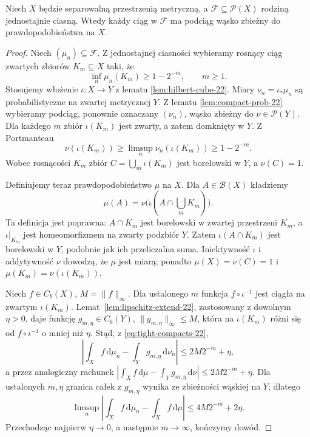 \begin{twierdzenie}
\label{thm:prokhorov-forward-22}
Niech $X$ będzie separowalną przestrzenią metryczną,
a $\mathcal F\subseteq\mathcal P(X)$ rodziną jednostajnie
ciasną. Wtedy każdy ciąg w $\mathcal F$ ma podciąg
wąsko zbieżny do prawdopodobieństwa na $X$.
\end{twierdzenie}
\begin{proof}
Niech $(\mu_n)\subseteq\mathcal F$.
Z jednostajnej ciasności wybieramy rosnący ciąg
zwartych zbiorów $K_m\subseteq X$ taki, że
\begin{equation}\label{eq:tight-compacts-22}
 \inf_n\mu_n(K_m)\ge1-2^{-m},\qquad m\ge1.
\end{equation}
Stosujemy włożenie $\iota:X\to Y$ z lematu
\ref{lem:hilbert-cube-22}. Miary
$\nu_n=\iota_*\mu_n$ są probabilistyczne na
zwartej metrycznej $Y$. Z lematu
\ref{lem:compact-prob-22} wybieramy podciąg,
ponownie oznaczany $(\nu_n)$, wąsko zbieżny
do $\nu\in\mathcal P(Y)$.
Dla każdego $m$ zbiór $\iota(K_m)$ jest zwarty,
a zatem domknięty w $Y$. Z Portmanteau
\[
\nu(\iota(K_m))\ge\limsup_n\nu_n(\iota(K_m))
\ge1-2^{-m}.
\]
Wobec rosnącości $K_m$ zbiór
$C=\bigcup_m\iota(K_m)$ jest borelowski w $Y$,
a $\nu(C)=1$.

Definiujemy teraz prawdopodobieństwo $\mu$ na $X$.
Dla $A\in\mathcal B(X)$ kładziemy
\begin{equation}\label{eq:pullback-limit-22}
\mu(A)=\nu\bigl(\iota(A\cap\bigcup_mK_m)\bigr).
\end{equation}
Ta definicja jest poprawna: $A\cap K_m$ jest
borelowski w zwartej przestrzeni $K_m$,
a $\iota|_{K_m}$ jest homeomorfizmem na zwarty
podzbiór $Y$. Zatem $\iota(A\cap K_m)$ jest
borelowski w $Y$, podobnie jak ich przeliczalna suma.
Iniektywność $\iota$ i addytywność $\nu$ dowodzą,
że $\mu$ jest miarą; ponadto $\mu(X)=\nu(C)=1$
i $\mu(K_m)=\nu(\iota(K_m))$.

Niech $f\in C_b(X)$, $M=\|f\|_\infty$.
Dla ustalonego $m$ funkcja $f\circ\iota^{-1}$
jest ciągła na zwartym $\iota(K_m)$.
Lemat~\ref{lem:lipschitz-extend-22}, zastosowany
z dowolnym $\eta>0$, daje funkcję
$g_{m,\eta}\in C_b(Y)$, $\|g_{m,\eta}\|_\infty\le M$,
która na $\iota(K_m)$ różni się od
$f\circ\iota^{-1}$ o mniej niż $\eta$.
Stąd, z \eqref{eq:tight-compacts-22},
\[
\left|\int_X f\,\mathrm d\mu_n-
\int_Y g_{m,\eta}\,\mathrm d\nu_n\right|\le2M2^{-m}+\eta,
\]
a przez analogiczny rachunek
$|\int_Xf\,\mathrm d\mu-\int_Yg_{m,\eta}\,\mathrm d\nu|
\le2M2^{-m}+\eta$.
Dla ustalonych $m,\eta$ granica całek z $g_{m,\eta}$ wynika
ze zbieżności wąskiej na $Y$; dlatego
\[
\limsup_n\left|\int_X f\,\mathrm d\mu_n-
\int_X f\,\mathrm d\mu\right|\le4M2^{-m}+2\eta.
\]
Przechodząc najpierw $\eta\to0$, a następnie
$m\to\infty$, kończymy dowód.
\end{proof}


